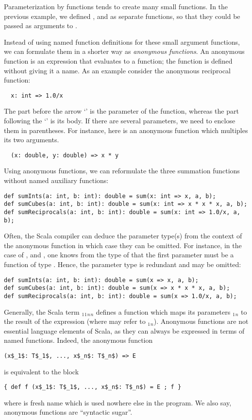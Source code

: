 \documentclass[a4paper,12pt,twoside,titlepage]{book}
\begin{document}
Parameterization by functions tends to create many small functions. In
the previous example, we defined ,  and
 as separate functions, so that they could be 
passed as arguments to .

Instead of using named function definitions for these small argument
functions, we can formulate them in a shorter way as {\em anonymous
functions}. An anonymous function is an expression that evaluates to a
function; the function is defined without giving it a name. As an
example consider the anonymous reciprocal function:
\begin{lstlisting}
  x: int => 1.0/x
\end{lstlisting}
The part before the arrow `\code{=>}' is the parameter of the function,
whereas the part following the `\code{=>}' is its body. If there are
several parameters, we need to enclose them in parentheses. For
instance, here is an anonymous function which multiples its two arguments.
\begin{lstlisting}
  (x: double, y: double) => x * y
\end{lstlisting}
Using anonymous functions, we can reformulate the three summation
functions without named auxiliary functions:
\begin{lstlisting}
def sumInts(a: int, b: int): double = sum(x: int => x, a, b);
def sumCubes(a: int, b: int): double = sum(x: int => x * x * x, a, b);
def sumReciprocals(a: int, b: int): double = sum(x: int => 1.0/x, a, b);
\end{lstlisting}
Often, the Scala compiler can deduce the parameter type(s) from the
context of the anonymous function in which case they can be omitted.
For instance, in the case of ,  and
, one knows from the type of
 that the first parameter must be a function of type
.  Hence, the parameter type  is
redundant and may be omitted:
\begin{lstlisting}
def sumInts(a: int, b: int): double = sum(x => x, a, b);
def sumCubes(a: int, b: int): double = sum(x => x * x * x, a, b);
def sumReciprocals(a: int, b: int): double = sum(x => 1.0/x, a, b);
\end{lstlisting}

Generally, the Scala term
$_1$$_1$$_n$$_n$ 
defines a function which maps its parameters
$_1$$_n$ to the result of the expression 
(where  may refer to $_1$$_n$).  Anonymous
functions are not essential language elements of Scala, as they can
always be expressed in terms of named functions. Indeed, the 
anonymous function
\begin{lstlisting}
(x$_1$: T$_1$, ..., x$_n$: T$_n$) => E
\end{lstlisting}
is equivalent to the block
\begin{lstlisting}
{ def f (x$_1$: T$_1$, ..., x$_n$: T$_n$) = E ; f }
\end{lstlisting}
where  is fresh name which is used nowhere else in the program.
We also say, anonymous functions are ``syntactic sugar''.
\end{document}
